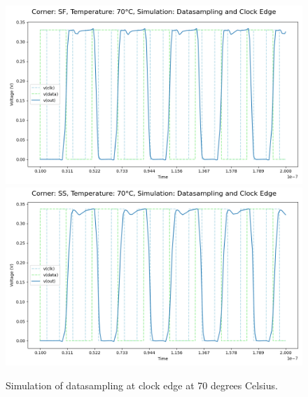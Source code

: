 \begin{figure}[H]
    \vspace{5pt}
    \includegraphics[height= 0.21\textheight]{figures/aimspice/SF/70/W1.csv.png}
    \vspace{5pt}
    \includegraphics[height= 0.21\textheight]{figures/aimspice/SS/70/W1.csv.png}
    \caption{Simulation of datasampling at clock edge at 70 degrees Celsius.}
    \label{fig:aimspice_W1_70}
\end{figure}

\pagebreak

